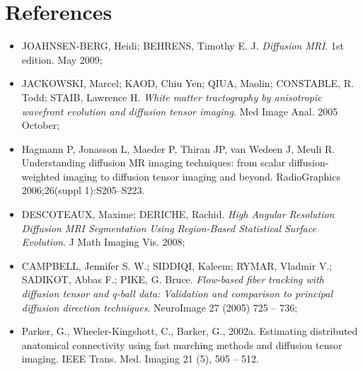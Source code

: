 \documentclass[a4paper,11pt]{report}
\begin{document}
\chapter{References} \label{ch: biblio}

\begin{itemize}
  \item JOAHNSEN-BERG, Heidi; BEHRENS, Timothy E. J. \textit{Diffusion MRI}. 1st edition. May 2009;
  \item JACKOWSKI, Marcel; KAOD, Chiu Yen; QIUA, Maolin; CONSTABLE, R. Todd; STAIB, Lawrence H. \textit{White matter tractography by anisotropic wavefront evolution and diffusion tensor imaging}. Med Image Anal. 2005 October;
  \item Hagmann P, Jonasson L, Maeder P, Thiran JP, van Wedeen J, Meuli R. Understanding diffusion MR imaging techniques: from scalar diffusion-weighted imaging to diffusion tensor imaging and beyond. RadioGraphics 2006;26(suppl 1):S205–S223.
  \item DESCOTEAUX, Maxime; DERICHE, Rachid. \textit{High Angular Resolution Diffusion MRI Segmentation Using
Region-Based Statistical Surface Evolution}. J Math Imaging Vis. 2008;
  \item CAMPBELL, Jennifer S. W.; SIDDIQI, Kaleem; RYMAR, Vladmir V.; SADIKOT, Abbas F.; PIKE, G. Bruce. \textit{Flow-based fiber tracking with diffusion tensor and q-ball data: Validation and comparison to principal diffusion direction techniques}. NeuroImage 27 (2005) 725 – 736;
  \item Parker, G., Wheeler-Kingshott, C., Barker, G., 2002a. Estimating distributed anatomical connectivity using fast marching methods and diffusion tensor imaging. IEEE Trans. Med. Imaging 21 (5), 505 – 512.
\end{itemize}
\end{document}
